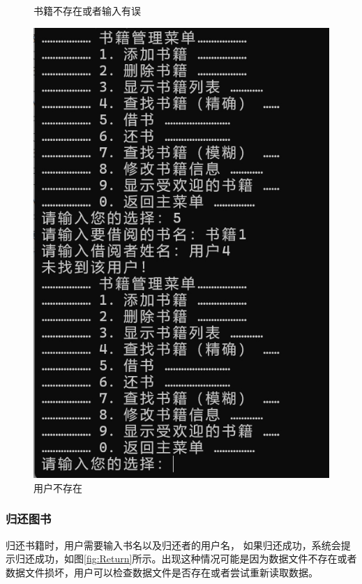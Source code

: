 \documentclass[12pt,twoside]{ctexart}
\begin{document}
\begin{figure}[H]
\begin{minipage}{0.48\textwidth}
        \caption{书籍不存在或者输入有误}
        \label{fig:BorrowFail1}
    \end{minipage}\hfill
    \begin{minipage}{0.48\textwidth}
        \centering
        \includegraphics[width=\textwidth]{Book/borrowsearchuserfail.png}
        \caption{用户不存在}
        \label{fig:BorrowFail2}
    \end{minipage}
\end{figure}

\newpage
\subsubsection{归还图书}

归还书籍时，用户需要输入书名以及归还者的用户名，
如果归还成功，系统会提示归还成功，如图\ref{fig:Return}所示。出现这种情况可能是因为数据文件不存在或者数据文件损坏，用户可以检查数据文件是否存在或者尝试重新读取数据。
\end{document}
